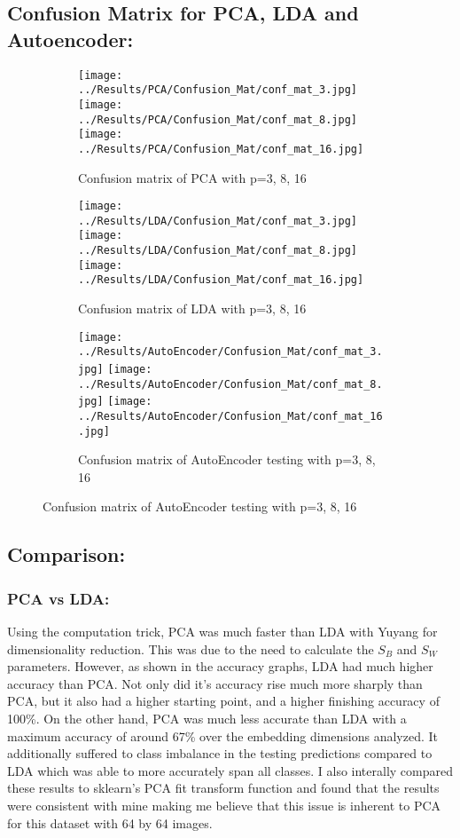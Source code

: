 \documentclass{article}
\begin{document}
\subsection{Confusion Matrix for PCA, LDA and Autoencoder:}
\begin{figure}[H]
    \centering
    \begin{subfigure}{\linewidth}
        \centering
        \texttt{[image: ../Results/PCA/Confusion\_Mat/conf\_mat\_3.jpg]}
        \texttt{[image: ../Results/PCA/Confusion\_Mat/conf\_mat\_8.jpg]}
        \texttt{[image: ../Results/PCA/Confusion\_Mat/conf\_mat\_16.jpg]}
        \caption{Confusion matrix of PCA with p=3, 8, 16}
    \end{subfigure}
    \begin{subfigure}{\linewidth}
        \centering
        \texttt{[image: ../Results/LDA/Confusion\_Mat/conf\_mat\_3.jpg]}
        \texttt{[image: ../Results/LDA/Confusion\_Mat/conf\_mat\_8.jpg]}
        \texttt{[image: ../Results/LDA/Confusion\_Mat/conf\_mat\_16.jpg]}
        \caption{Confusion matrix of LDA with p=3, 8, 16}
    \end{subfigure}
    \begin{subfigure}{\linewidth}
        \centering
        \texttt{[image: ../Results/AutoEncoder/Confusion\_Mat/conf\_mat\_3.jpg]}
        \texttt{[image: ../Results/AutoEncoder/Confusion\_Mat/conf\_mat\_8.jpg]}
        \texttt{[image: ../Results/AutoEncoder/Confusion\_Mat/conf\_mat\_16.jpg]}
        \caption{Confusion matrix of AutoEncoder testing with p=3, 8, 16}
    \end{subfigure}
\end{figure}

\subsection{Comparison:}
\subsubsection{PCA vs LDA:}
Using the computation trick, PCA was much faster than LDA with Yuyang for dimensionality reduction. This was due to the need to calculate the $S_B$ and $S_W$ parameters. However, as shown in the accuracy graphs, LDA had much higher accuracy than PCA. Not only did it's accuracy rise much more sharply than PCA, but it also had a higher starting point, and a higher finishing accuracy of 100\%. On the other hand, PCA was much less accurate than LDA with a maximum accuracy of around 67\% over the embedding dimensions analyzed. It additionally suffered to class imbalance in the testing predictions compared to LDA which was able to more accurately span all classes. I also interally compared these results to sklearn's PCA fit transform function and found that the results were consistent with mine making me believe that this issue is inherent to PCA for this dataset with 64 by 64 images.
\end{document}
